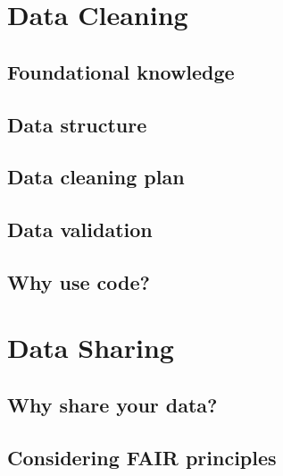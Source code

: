 \documentclass[
]{book}
\begin{document}
\hypertarget{data-cleaning}{%
\chapter{Data Cleaning}\label{data-cleaning}}

\hypertarget{foundational-knowledge}{%
\section{Foundational knowledge}\label{foundational-knowledge}}

\hypertarget{data-structure}{%
\section{Data structure}\label{data-structure}}

\hypertarget{data-cleaning-plan}{%
\section{Data cleaning plan}\label{data-cleaning-plan}}

\hypertarget{data-validation}{%
\section{Data validation}\label{data-validation}}

\hypertarget{why-use-code}{%
\section{Why use code?}\label{why-use-code}}

\hypertarget{data-sharing}{%
\chapter{Data Sharing}\label{data-sharing}}

\hypertarget{why-share-your-data}{%
\section{Why share your data?}\label{why-share-your-data}}

\hypertarget{considering-fair-principles}{%
\section{Considering FAIR principles}\label{considering-fair-principles}}
\end{document}
